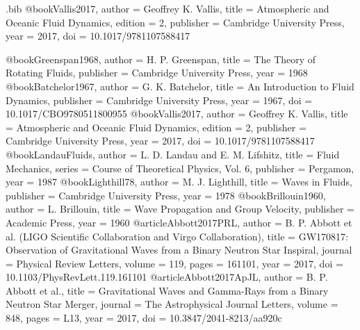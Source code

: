 \documentclass[12pt]{article}
\begin{document}
\begin{filecontents*}{\jobname.bib}
@book{Vallis2017,
  author    = {Geoffrey K. Vallis},
  title     = {Atmospheric and Oceanic Fluid Dynamics},
  edition   = {2},
  publisher = {Cambridge University Press},
  year      = {2017},
  doi       = {10.1017/9781107588417}
}

    @book{Greenspan1968,
  author    = {H. P. Greenspan},
  title     = {The Theory of Rotating Fluids},
  publisher = {Cambridge University Press},
  year      = {1968}
}
@book{Batchelor1967,
  author    = {G. K. Batchelor},
  title     = {An Introduction to Fluid Dynamics},
  publisher = {Cambridge University Press},
  year      = {1967},
  doi       = {10.1017/CBO9780511800955}
}
@book{Vallis2017,
  author    = {Geoffrey K. Vallis},
  title     = {Atmospheric and Oceanic Fluid Dynamics},
  edition   = {2},
  publisher = {Cambridge University Press},
  year      = {2017},
  doi       = {10.1017/9781107588417}
}
@book{LandauFluids,
  author    = {L. D. Landau and E. M. Lifshitz},
  title     = {Fluid Mechanics},
  series    = {Course of Theoretical Physics, Vol. 6},
  publisher = {Pergamon},
  year      = {1987}
}
@book{Lighthill78,
  author    = {M. J. Lighthill},
  title     = {Waves in Fluids},
  publisher = {Cambridge University Press},
  year      = {1978}
}
@book{Brillouin1960,
  author    = {L. Brillouin},
  title     = {Wave Propagation and Group Velocity},
  publisher = {Academic Press},
  year      = {1960}
}
@article{Abbott2017PRL,
  author  = {B. P. Abbott et al. (LIGO Scientific Collaboration and Virgo Collaboration)},
  title   = {GW170817: Observation of Gravitational Waves from a Binary Neutron Star Inspiral},
  journal = {Physical Review Letters},
  volume  = {119},
  pages   = {161101},
  year    = {2017},
  doi     = {10.1103/PhysRevLett.119.161101}
}
@article{Abbott2017ApJL,
  author  = {B. P. Abbott et al.},
  title   = {Gravitational Waves and Gamma-Rays from a Binary Neutron Star Merger},
  journal = {The Astrophysical Journal Letters},
  volume  = {848},
  pages   = {L13},
  year    = {2017},
  doi     = {10.3847/2041-8213/aa920c}
}

\end{filecontents*}
\end{document}
